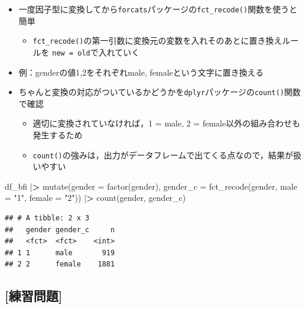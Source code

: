 \documentclass[
  xelatex,ja=standard, b5paper]{bxjsbook}
\newenvironment{Shaded}{\begin{snugshade}}{\end{snugshade}}
\newcommand{\AttributeTok}[1]{\textcolor[rgb]{0.77,0.63,0.00}{#1}}
\newcommand{\ErrorTok}[1]{\textcolor[rgb]{0.64,0.00,0.00}{\textbf{#1}}}
\newcommand{\FunctionTok}[1]{\textcolor[rgb]{0.00,0.00,0.00}{#1}}
\newcommand{\NormalTok}[1]{#1}
\newcommand{\SpecialCharTok}[1]{\textcolor[rgb]{0.00,0.00,0.00}{#1}}
\newcommand{\StringTok}[1]{\textcolor[rgb]{0.31,0.60,0.02}{#1}}
\providecommand{\tightlist}{%
  \setlength{\itemsep}{0pt}\setlength{\parskip}{0pt}}
\begin{document}
\begin{itemize}
\tightlist
\item
  一度因子型に変換してから\texttt{forcats}パッケージの\texttt{fct\_recode()}関数を使うと簡単

  \begin{itemize}
  \tightlist
  \item
    \texttt{fct\_recode()}の第一引数に変換元の変数を入れそのあとに置き換えルールを \texttt{new\ =\ old}で入れていく
  \end{itemize}
\item
  例：genderの値1,2をそれぞれmale, femaleという文字に置き換える
\item
  ちゃんと変換の対応がついているかどうかを\texttt{dplyr}パッケージの\texttt{count()}関数で確認

  \begin{itemize}
  \tightlist
  \item
    適切に変換されていなければ，1 = male, 2 = female以外の組み合わせも発生するため
  \item
    \texttt{count()}の強みは，出力がデータフレームで出てくる点なので，結果が扱いやすい
  \end{itemize}
\end{itemize}

\begin{Shaded}
\begin{Highlighting}[]
\NormalTok{df\_bfi }\SpecialCharTok{|}\ErrorTok{\textgreater{}}
  \FunctionTok{mutate}\NormalTok{(}\AttributeTok{gender =} \FunctionTok{factor}\NormalTok{(gender),}
         \AttributeTok{gender\_c =} \FunctionTok{fct\_recode}\NormalTok{(gender, }
                               \AttributeTok{male   =} \StringTok{"1"}\NormalTok{,}
                               \AttributeTok{female =} \StringTok{"2"}\NormalTok{)) }\SpecialCharTok{|}\ErrorTok{\textgreater{}} 
  \FunctionTok{count}\NormalTok{(gender, gender\_c)}
\end{Highlighting}
\end{Shaded}

\begin{verbatim}
## # A tibble: 2 x 3
##   gender gender_c     n
##   <fct>  <fct>    <int>
## 1 1      male       919
## 2 2      female    1881
\end{verbatim}

\hypertarget{ux7df4ux7fd2ux554fux984c-12}{%
\subsection{{[}練習問題{]}}\label{ux7df4ux7fd2ux554fux984c-12}}
\end{document}

